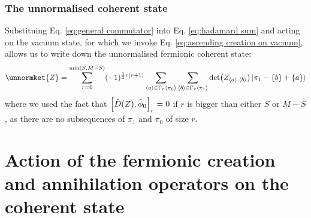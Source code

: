 \documentclass[12pt]{article}
\newcommand{\seq}[1]{\langle #1\rangle}
\begin{document}
	\subsubsection{The unnormalised coherent state}
	Substituing Eq. \ref{eq:general commutator} into Eq. \ref{eq:hadamard sum} and acting on the vacuum state, for which we invoke Eq. \ref{eq:ascending creation on vacuum}, allows us to write down the unnormalised fermionic coherent state:
	\begin{equation}\label{eq:unnormalised coherent state}
	\unnormket{Z}=\sum_{r=0}^{\min(S,M-S)}(-1)^{\frac{1}{2}r(r+1)}\sum_{\seq{a}\in\Gamma_r\seq{\pi_0}}\sum_{\seq{b}\in\Gamma_r\seq{\pi_1}}\det(Z_{\seq{a},\seq{b}})\ket{\pi_1-\{b\}+\{a\}}
	\end{equation}
	where we used the fact that $\comm{\hat{D}(Z)}{\hat{\phi}_0}_r=0$ if $r$ is bigger than either $S$ or $M-S$, as there are no subsequences of $\pi_1$ and $\pi_0$ of size $r$.
	
	\section{Action of the fermionic creation and annihilation operators on the coherent state}
	
\end{document}
